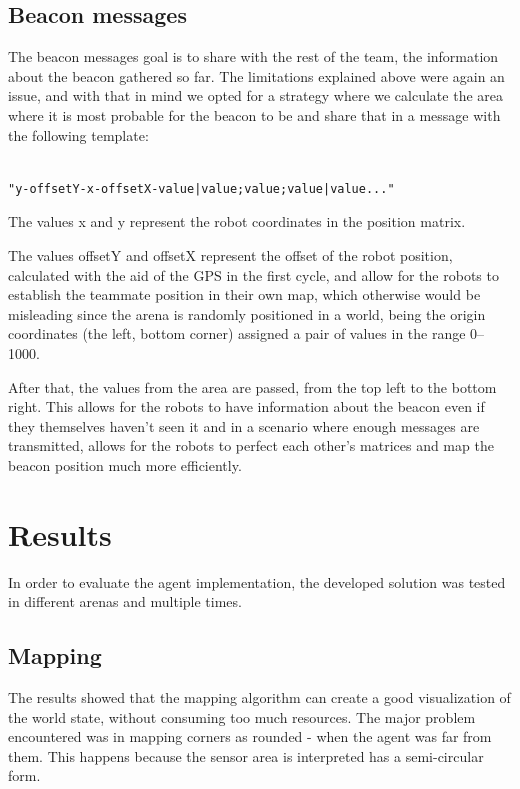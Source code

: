 \documentclass[oribibl]{llncs}
\begin{document}
\subsection{Beacon messages}

The beacon messages goal is to share with the rest of the team, the information about the beacon gathered so far. The limitations explained above were again an issue, and with that in mind we opted for a strategy where we calculate the area where it is most probable for the beacon to be and share that in a message with the following template:

\begin{verbatim}

"y-offsetY-x-offsetX-value|value;value;value|value..."

\end{verbatim}

The values x and y represent the robot coordinates in the position matrix.

The values offsetY and offsetX represent the offset of the robot position, calculated with the aid of the GPS in the first cycle, and allow for the robots to establish the teammate position in their own map, which otherwise would be misleading since the arena is randomly positioned in a world, being the origin coordinates (the left, bottom corner) assigned a pair of values in the range 0–1000.

After that, the values from the area are passed, from the top left to the bottom right.
This allows for the robots to have information about the beacon even if they themselves haven't seen it and in a scenario where enough messages are transmitted, allows for the robots to perfect each other's matrices and map the beacon position much more efficiently.


\section{Results}

In order to evaluate the agent implementation, the developed solution was tested in different arenas and multiple times.

\subsection{Mapping}

The results showed that the mapping algorithm can create a good visualization of the world state, without consuming too much resources. The major problem encountered was in mapping corners as rounded - when the agent was far from them. This happens because the sensor area is interpreted has a semi-circular form. 
\end{document}
